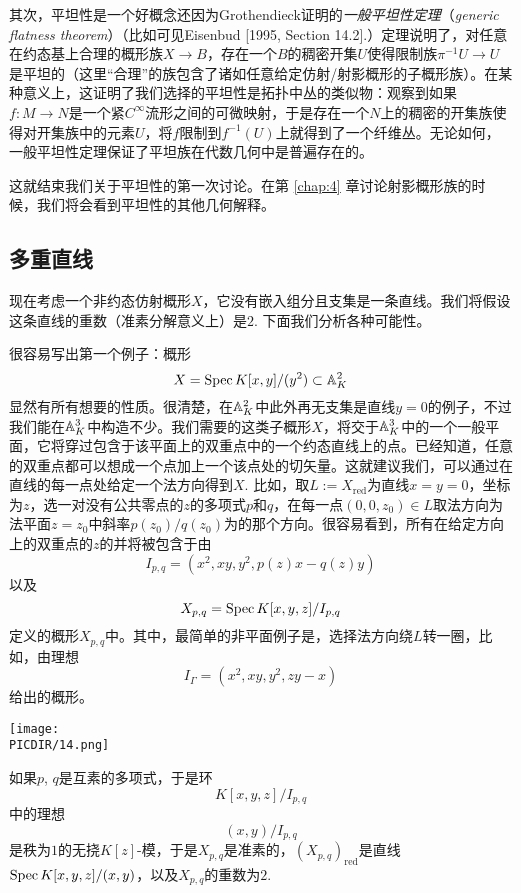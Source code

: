 其次，平坦性是一个好概念还因为Grothendieck证明的\textit{一般平坦性定理}（{\it generic flatness theorem}）（比如可见Eisenbud [1995, Section 14.2].）定理说明了，对任意在约态基上合理的概形族$X\to B$，存在一个$B$的稠密开集$U$使得限制族$\pi^{-1}U\to U$是平坦的（这里“合理”的族包含了诸如任意给定仿射/射影概形的子概形族）。在某种意义上，这证明了我们选择的平坦性是拓扑中丛的类似物：观察到如果$f:M\to N$是一个紧$C^\infty$流形之间的可微映射，于是存在一个$N$上的稠密的开集族使得对开集族中的元素$U$，将$f$限制到$f^{-1}(U)$上就得到了一个纤维丛。无论如何，一般平坦性定理保证了平坦族在代数几何中是普遍存在的。

这就结束我们关于平坦性的第一次讨论。在第 \ref{chap:4} 章讨论射影概形族的时候，我们将会看到平坦性的其他几何解释。

\subsection{多重直线}

现在考虑一个非约态仿射概形$X$，它没有嵌入组分且支集是一条直线。我们将假设这条直线的重数（准素分解意义上）是$2$. 下面我们分析各种可能性。

很容易写出第一个例子：概形
\[
	X=\operatorname{Spec} K[x,y]/(y^2)\subset \mathbb{A}_K^2
\]
显然有所有想要的性质。很清楚，在$\mathbb{A}_K^2$中此外再无支集是直线$y=0$的例子，不过我们能在$\mathbb{A}_K^3$中构造不少。我们需要的这类子概形$X$，将交于$\mathbb{A}_{K}^3$中的一个一般平面，它将穿过包含于该平面上的双重点中的一个约态直线上的点。\nottran 已经知道，任意的双重点都可以想成一个点加上一个该点处的切矢量。这就建议我们，可以通过在直线的每一点处给定一个法方向得到$X$. 比如，取$L:=X_{\text{red}}$为直线$x=y=0$，坐标为$z$，选一对没有公共零点的$z$的多项式$p$和$q$，在每一点$(0,0,z_0)\in L$取法方向为法平面$z=z_0$中斜率$p(z_0)/q(z_0)$为的那个方向。很容易看到，所有在给定方向上的双重点的$z$的并将被包含于由
\[
	I_{p,q}=(x^2,xy,y^2,p(z)x-q(z)y)
\]
以及
\[
	X_{p,q}=\operatorname{Spec} K[x,y,z]/I_{p,q}
\]
定义的概形$X_{p,q}$中。其中，最简单的非平面例子是，选择法方向绕$L$转一圈，比如，由理想
\[
	I_\Gamma=(x^2,xy,y^2,zy-x)
\]
给出的概形。

\begin{center}\texttt{[image: \\PICDIR/14.png]}\end{center}

\begin{exe}
如果$p$, $q$是互素的多项式，于是环
\[
	K[x,y,z]/I_{p,q}
\]
中的理想
\[
	(x,y)/I_{p,q}
\]
是秩为$1$的无挠$K[z]$\hyp 模，于是$X_{p,q}$是准素的，$(X_{p,q})_{\text{red}}$是直线$\operatorname{Spec} K[x,y,z]/(x,y)$，以及$X_{p,q}$的重数为$2$.
\end{exe}

